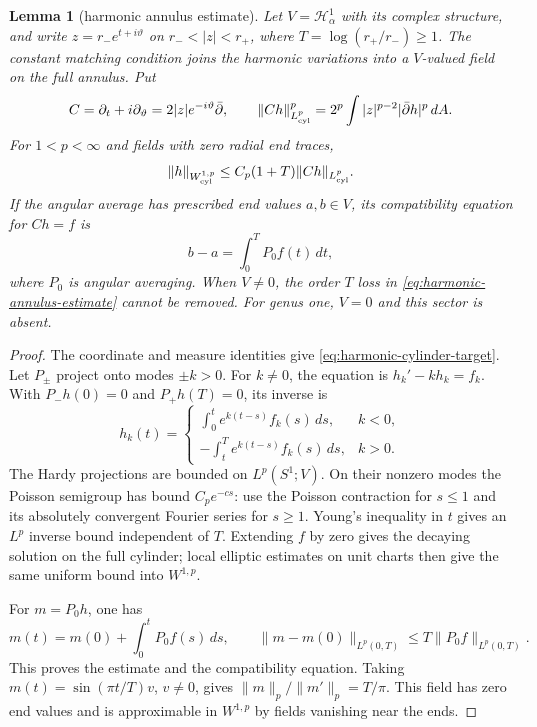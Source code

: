 \documentclass[11pt]{amsart}
\newtheorem{lemma}[theorem]{Lemma}
\theoremstyle{definition}
\theoremstyle{remark}
\theoremstyle{plain}
\begin{document}
\begin{lemma}[harmonic annulus estimate]\label{lem:harmonic-annulus}
Let $V=\mathcal H^1_\alpha$ with its complex structure, and write
$z=r_-e^{t+i\vartheta}$ on $r_-<|z|<r_+$, where
$T=\log(r_+/r_-)\geq1$. The constant matching condition joins the
harmonic variations into a $V$-valued field on the full annulus. Put
\begin{equation}\label{eq:harmonic-cylinder-target}
 C=\partial_t+i\partial_\vartheta
   =2|z|e^{-i\vartheta}\bar\partial,
 \qquad
 \|Ch\|_{L^p_{\rm cyl}}^p
 =2^p\int |z|^{p-2}|\bar\partial h|^p\,dA.
\end{equation}
For $1<p<\infty$ and fields with zero radial end traces,
\begin{equation}\label{eq:harmonic-annulus-estimate}
 \|h\|_{W^{1,p}_{\rm cyl}}\leq C_p(1+T)\|Ch\|_{L^p_{\rm cyl}}.
\end{equation}
If the angular average has prescribed end values $a,b\in V$, its
compatibility equation for $Ch=f$ is
\begin{equation}\label{eq:harmonic-average-matching}
 b-a=\int_0^T P_0f(t)\,dt,
\end{equation}
where $P_0$ is angular averaging. When $V\ne0$, the order $T$ loss
in \eqref{eq:harmonic-annulus-estimate} cannot be removed. For genus
one, $V=0$ and this sector is absent.
\end{lemma}

\begin{proof}
The coordinate and measure identities give
\eqref{eq:harmonic-cylinder-target}. Let $P_\pm$ project onto modes
$\pm k>0$. For $k\ne0$, the equation is $h_k'-kh_k=f_k$.
With $P_-h(0)=0$ and
$P_+h(T)=0$, its inverse is
\[
 h_k(t)=\begin{cases}
 \displaystyle\int_0^t e^{k(t-s)}f_k(s)\,ds,&k<0,\\[4pt]
 \displaystyle-\int_t^T e^{k(t-s)}f_k(s)\,ds,&k>0.
 \end{cases}
\]
The Hardy projections are bounded on $L^p(S^1;V)$. On their nonzero
modes the Poisson semigroup has bound $C_pe^{-cs}$: use the Poisson
contraction for $s\leq1$ and its absolutely convergent Fourier series
for $s\geq1$. Young's inequality in $t$ gives an $L^p$ inverse
bound independent of $T$. Extending $f$ by zero gives the decaying
solution on the full cylinder; local elliptic estimates on unit charts
then give the same uniform bound into $W^{1,p}$.

For $m=P_0h$, one has
\[
 m(t)=m(0)+\int_0^tP_0f(s)\,ds,
 \qquad
 \|m-m(0)\|_{L^p(0,T)}\leq T\|P_0f\|_{L^p(0,T)}.
\]
This proves the estimate and the compatibility equation. Taking
$m(t)=\sin(\pi t/T)v$, $v\ne0$, gives
$\|m\|_p/\|m'\|_p=T/\pi$. This field has zero end values and is
approximable in $W^{1,p}$ by fields vanishing near the ends.
\end{proof}
\end{document}
